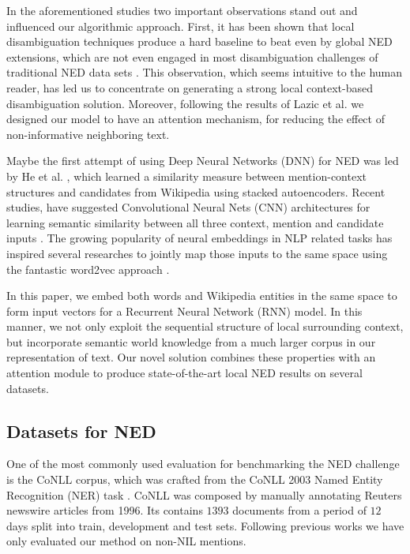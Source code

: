 \documentclass[11pt]{article}
\newcommand\toin{\todo[inline]}
\begin{document}
In the aforementioned studies two important observations stand out and influenced our algorithmic approach. First, it has been shown that local disambiguation techniques produce a hard baseline to beat even by global NED extensions, which are not even engaged in most disambiguation challenges of traditional NED data sets \cite{Ratinov2011,hoffart2011robust}. This observation, which seems intuitive to the human reader, has led us to concentrate on generating a strong local context-based disambiguation solution. Moreover, following the results of Lazic et al. we designed our model to have an attention mechanism, for reducing the effect of non-informative neighboring text.

Maybe the first attempt of using Deep Neural Networks (DNN) for NED was led by He et al. \cite{He2013}, which learned a similarity measure between mention-context structures and candidates from Wikipedia using stacked autoencoders. Recent studies, have suggested Convolutional Neural Nets (CNN) architectures for learning semantic similarity between all three context, mention and candidate inputs \cite{sun2015modeling,francis2016capturing}. The growing popularity of neural embeddings in NLP related tasks has inspired several researches to jointly map those inputs to the same space using the fantastic word2vec approach \cite{yamada2016joint,Melamud2014}.

\toin{Where is Globerson? Noam: not DNN or ANN}

In this paper, we embed both words and Wikipedia entities in the same space to form input vectors for a Recurrent Neural Network (RNN) model. In this manner, we not only exploit the sequential structure of local surrounding context, but incorporate semantic world knowledge from a much larger corpus in our representation of text. Our novel solution combines these properties with an attention module to produce state-of-the-art local NED results on several datasets.

\subsection{Datasets for NED}

One of the most commonly used evaluation for benchmarking the NED challenge \cite{Globerson2016,Hachey2013,Yamada2016,Pershina2015} is the CoNLL corpus, which was crafted from the CoNLL 2003 Named Entity Recognition (NER) task . CoNLL was composed by manually annotating Reuters newswire articles from 1996. Its contains $1393$ documents from a period of $12$ days split into train, development and test sets. Following previous works we have only evaluated our method on non-NIL mentions.
\end{document}
